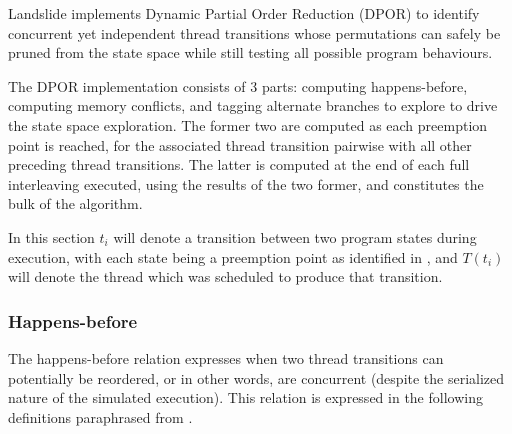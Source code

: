 Landslide implements Dynamic Partial Order Reduction (DPOR) \cite{dpor}
to identify concurrent yet independent thread transitions
whose permutations can safely be pruned from the state space
while still testing all possible program behaviours.

The DPOR implementation consists of 3 parts:
computing happens-before,
computing memory conflicts,
and tagging alternate branches to explore to drive the state space exploration.
The former two are computed as each preemption point is reached,
for the associated thread transition pairwise with all other preceding thread transitions.
The latter is computed at the end of each full interleaving executed, using the results of the two former,
and constitutes the bulk of the algorithm.

In this section $t_i$ will denote a transition between two program states during execution,
with each state being a preemption point as identified in \sect{\ref{sec:landslide-pps}},
and $T(t_i)$ will denote the thread which was scheduled to produce that transition.

\subsubsection{Happens-before}

The happens-before relation expresses when two thread transitions can potentially be reordered,
or in other words, are concurrent (despite the serialized nature of the simulated execution).
This relation is expressed in the following definitions paraphrased from \cite{dpor}.

